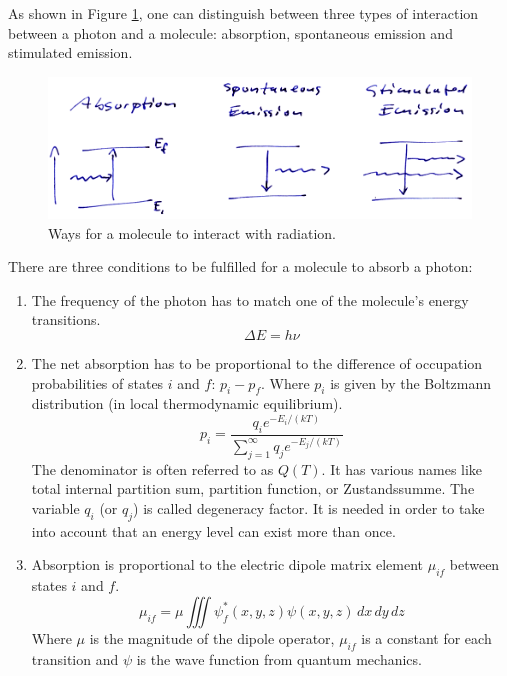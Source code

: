 As shown in Figure \ref{fig:interaction_types}, one can distinguish
between three types of interaction between a photon and a molecule:
absorption, spontaneous emission and stimulated emission.

\begin{figure}
  \centering
  \includegraphics[width=\hsize]{figures/interaction_types}
  \caption{Ways for a molecule to interact with radiation.}
  \label{fig:interaction_types}
\end{figure}

There are three conditions to be fulfilled for a molecule to absorb a
photon:
\begin{enumerate}
\item The frequency of the photon has to match one of the molecule's energy
transitions.
\begin{equation}
  \Delta E = h \nu
\end{equation}

\item The net absorption has to be proportional to the difference of occupation
probabilities of states $i$ and $f$: $p_i - p_f$. Where $p_i$ is given by the
Boltzmann distribution (in local thermodynamic equilibrium).
\begin{equation}
  p_i = \frac{q_i e^{-E_i / (kT)}}
        {\sum_{j=1}^\infty q_j e^{-E_j / (kT)}}
\end{equation}
The denominator is often referred to as $Q(T)$. It has various names like total
internal partition sum, partition function, or Zustandssumme. The variable $q_i$
(or $q_j$) is called degeneracy factor. It is needed in order to take into account
that an energy level can exist more than once.

\item Absorption is proportional to the electric dipole matrix element $\mu_{if}$
between states $i$ and $f$.
\begin{equation}
  \mu_{if} = \mu \iiint \psi_f^*(x,y,z) \psi(x,y,z) \,dx\,dy\,dz
\end{equation}
Where $\mu$ is the magnitude of the dipole operator, $\mu_{if}$ is a constant
for each transition and $\psi$ is the wave function from quantum mechanics.
\end{enumerate}

